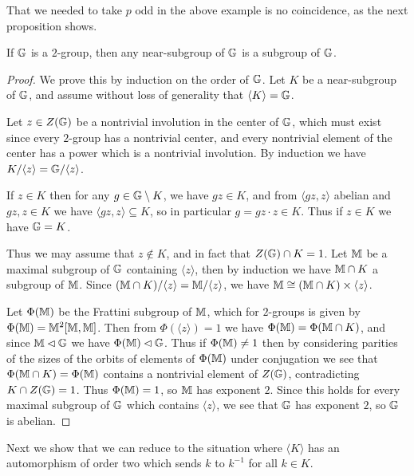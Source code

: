 \documentclass[letterpaper,11pt]{article}
\begin{document}
That we needed to take $p$ odd in the above example is no coincidence, as the next proposition shows.

\begin{prop} If $\mathbb{G}$ is a $2$-group, then any near-subgroup of $\mathbb{G}$ is a subgroup of $\mathbb{G}$.
\end{prop}
\begin{proof} We prove this by induction on the order of $\mathbb{G}$. Let $K$ be a near-subgroup of $\mathbb{G}$, and assume without loss of generality that $\langle K\rangle = \mathbb{G}$.%

Let $z \in Z(\mathbb{G})$ be a nontrivial involution in the center of $\mathbb{G}$, which must exist since every $2$-group has a nontrivial center, and every nontrivial element of the center has a power which is a nontrivial involution. By induction we have $K/\langle z\rangle = \mathbb{G}/\langle z\rangle$.

If $z \in K$ then for any $g \in \mathbb{G}\setminus K$, we have $gz \in K$, and from $\langle gz,z\rangle$ abelian and $gz,z \in K$ we have $\langle gz,z\rangle \subseteq K$, so in particular $g = gz\cdot z \in K$. Thus if $z \in K$ we have $\mathbb{G} = K$.

Thus we may assume that $z \not\in K$, and in fact that $Z(\mathbb{G}) \cap K = 1$. Let $\mathbb{M}$ be a maximal subgroup of $\mathbb{G}$ containing $\langle z\rangle$, then by induction we have $\mathbb{M} \cap K$ a subgroup of $\mathbb{M}$. Since $(\mathbb{M} \cap K)/\langle z\rangle = \mathbb{M}/\langle z\rangle$, we have $\mathbb{M} \cong (\mathbb{M}\cap K)\times \langle z\rangle$.

Let $\Phi(\mathbb{M})$ be the Frattini subgroup of $\mathbb{M}$, which for $2$-groups is given by $\Phi(\mathbb{M}) = \mathbb{M}^2[\mathbb{M},\mathbb{M}]$. Then from $\Phi(\langle z\rangle) = 1$ we have $\Phi(\mathbb{M}) = \Phi(\mathbb{M}\cap K)$, and since $\mathbb{M} \lhd \mathbb{G}$ we have $\Phi(\mathbb{M}) \lhd \mathbb{G}$. Thus if $\Phi(\mathbb{M}) \ne 1$ then by considering parities of the sizes of the orbits of elements of $\Phi(\mathbb{M})$ under conjugation we see that $\Phi(\mathbb{M} \cap K) = \Phi(\mathbb{M})$ contains a nontrivial element of $Z(\mathbb{G})$, contradicting $K \cap Z(\mathbb{G}) = 1$. Thus $\Phi(\mathbb{M}) = 1$, so $\mathbb{M}$ has exponent $2$. Since this holds for every maximal subgroup of $\mathbb{G}$ which contains $\langle z\rangle$, we see that $\mathbb{G}$ has exponent $2$, so $\mathbb{G}$ is abelian.
\end{proof}

Next we show that we can reduce to the situation where $\langle K\rangle$ has an automorphism of order two which sends $k$ to $k^{-1}$ for all $k \in K$.
\end{document}
